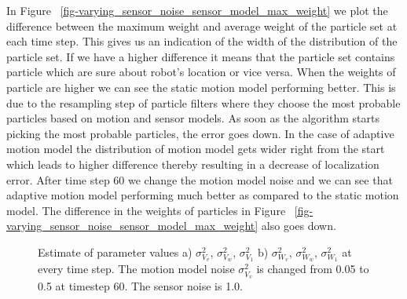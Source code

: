 \documentclass[12pt]{dalcsthesis}
\begin{document}
In Figure ~\ref{fig-varying_sensor_noise_sensor_model_max_weight} we plot the difference between the maximum weight and average weight of the particle set at each time step. This gives us an indication of the width of the distribution of the particle set. If we have a higher difference it means that the particle set contains particle which are sure about robot's location or vice versa. When the weights of particle are higher we can see the static motion model performing better. This is due to the resampling step of particle filters where they choose the most probable particles based on motion and sensor models. As soon as the algorithm starts picking the most probable particles, the error goes down. In the case of adaptive motion model the distribution of motion model gets wider right from the start which leads to higher difference thereby resulting in a decrease of localization error. After time step 60 we change the motion model noise and we can see that adaptive motion model performing much better as 
compared to the static motion model. The difference in the weights of particles in Figure ~\ref{fig-varying_sensor_noise_sensor_model_max_weight} also goes down.

\begin{figure}[!ht]
  \centering
     \qquad
  \caption{\label{fig-varying_sensor_noise_motion_model} Estimate of parameter values a) $\sigma_{V_{v}}^{2}$, $\sigma_{V_{w}}^{2}$,  $\sigma_{V_{1}}^{2}$ b)  $\sigma_{W_{v}}^{2}$, $\sigma_{W_{w}}^{2}$, $\sigma_{W_{1}}^{2}$ at every time step. The motion model noise $\sigma_{V_{v}}^{2}$ is changed from 0.05 to 0.5 at timestep 60. The sensor noise is 1.0.}
\end{figure}
\end{document}
